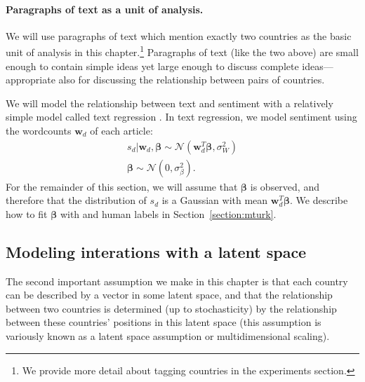 \paragraph{Paragraphs of text as a unit of analysis.} We will use
paragraphs of text which mention exactly two countries as the basic
unit of analysis in this chapter.\footnote{We provide more detail
  about tagging countries in the experiments section.}  Paragraphs of
text (like the two above) are small enough to contain simple ideas yet
large enough to discuss complete ideas---appropriate also for
discussing the relationship between pairs of countries.

We will model the relationship between text and sentiment with a
relatively simple model called text regression \citep{kogan:2009}.  In
text regression, we model sentiment using the wordcounts $\bm w_d$ of
each article:
\begin{align}
  s_d | \bm w_d, \bm \beta \sim \mathcal{N}( \bm w_d^T \bm \beta,
  \sigma_W^2 ) \nonumber \\
  \bm \beta \sim \mathcal{N}(0, \sigma_\beta^2 ).
  \label{eq:sentiment_text}
\end{align}
For the remainder of this section, we will assume that $\bm \beta$ is
observed, and therefore that the distribution of $s_d$ is a Gaussian with mean
$\bm w_d^T \bm \beta$.  We describe how to fit $\bm \beta$ with
 and human labels in
Section~\ref{section:mturk}.

\subsection{Modeling interations with a latent space}
\label{sec:fr_latent_space_model}
The second important assumption we make in this chapter is that each
country can be described by a vector in some latent space, and that
the relationship between two countries is determined (up to
stochasticity) by the relationship between these countries' positions
in this latent space (this assumption is variously known as a latent
space assumption or multidimensional scaling).

